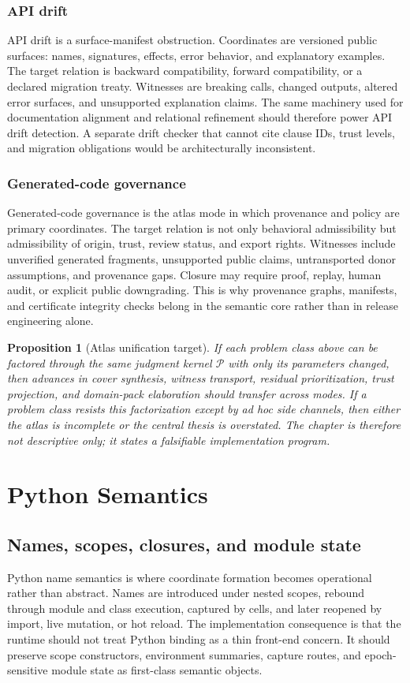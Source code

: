 \documentclass[11pt]{report}
\newtheorem{proposition}[definition]{Proposition}
\begin{document}
\section{API drift}
API drift is a surface-manifest obstruction. Coordinates are versioned public surfaces: names, signatures, effects, error behavior, and explanatory examples. The target relation is backward compatibility, forward compatibility, or a declared migration treaty. Witnesses are breaking calls, changed outputs, altered error surfaces, and unsupported explanation claims. The same machinery used for documentation alignment and relational refinement should therefore power API drift detection. A separate drift checker that cannot cite clause IDs, trust levels, and migration obligations would be architecturally inconsistent.
\section{Generated-code governance}
Generated-code governance is the atlas mode in which provenance and policy are primary coordinates. The target relation is not only behavioral admissibility but admissibility of origin, trust, review status, and export rights. Witnesses include unverified generated fragments, unsupported public claims, untransported donor assumptions, and provenance gaps. Closure may require proof, replay, human audit, or explicit public downgrading. This is why provenance graphs, manifests, and certificate integrity checks belong in the semantic core rather than in release engineering alone.

\begin{proposition}[Atlas unification target]
If each problem class above can be factored through the same judgment kernel $\mathcal{P}$ with only its parameters changed, then advances in cover synthesis, witness transport, residual prioritization, trust projection, and domain-pack elaboration should transfer across modes. If a problem class resists this factorization except by ad hoc side channels, then either the atlas is incomplete or the central thesis is overstated. The chapter is therefore not descriptive only; it states a falsifiable implementation program.
\end{proposition}
\part{Python Semantics}
\chapter{Names, scopes, closures, and module state}
Python name semantics is where coordinate formation becomes operational rather than abstract. Names are introduced under nested scopes, rebound through module and class execution, captured by cells, and later reopened by import, live mutation, or hot reload. The implementation consequence is that the runtime should not treat Python binding as a thin front-end concern. It should preserve scope constructors, environment summaries, capture routes, and epoch-sensitive module state as first-class semantic objects.
\end{document}
